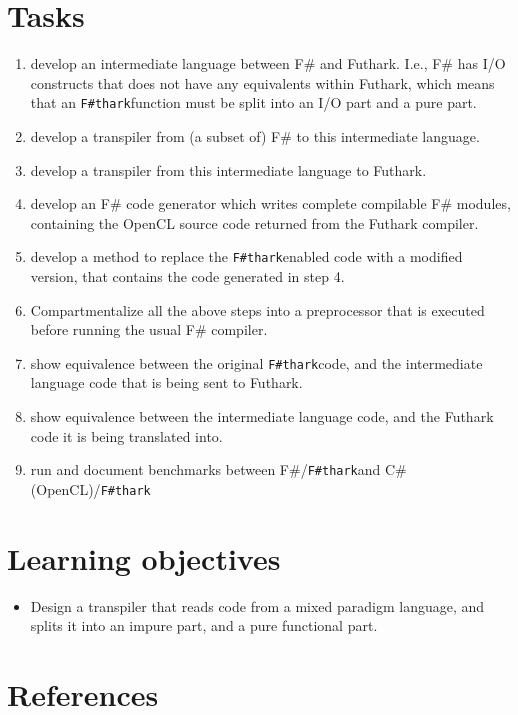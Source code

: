 \documentclass{article}
\newcommand{\fshark}{\texttt{F\#thark}}
\begin{document}
\section{Tasks}
\begin{enumerate}
    \item develop an intermediate language between F\# and Futhark.
    I.e., F\# has I/O constructs that does not have any equivalents within 
    Futhark, which means that an \fshark function must be split into an I/O part
    and a pure part.

    \item develop a transpiler from (a subset of) F\# to this intermediate
    language.

    \item develop a transpiler from this intermediate language to Futhark.

    \item develop an F\# code generator which writes complete compilable F\#
    modules, containing the OpenCL source code returned from the Futhark 
    compiler.

    \item develop a method to replace the \fshark enabled code with a modified 
    version, that contains the code generated in step 4.
    
    \item Compartmentalize all the above steps into a preprocessor
    that is executed before running the usual F\# compiler.
    
    \item show equivalence between the original \fshark code, and the 
    intermediate language code that is being sent to Futhark.

    \item show equivalence between the intermediate language code,
    and the Futhark code it is being translated into.

    \item run and document benchmarks between F\#/\fshark and 
    C\# (OpenCL)/\fshark 
\end{enumerate}

\section{Learning objectives}
\begin{itemize}
    \item Design a transpiler that reads code from a mixed paradigm language,
    and splits it into an impure part, and a pure functional part.
    
\end{itemize}

\section*{References}
\end{document}
